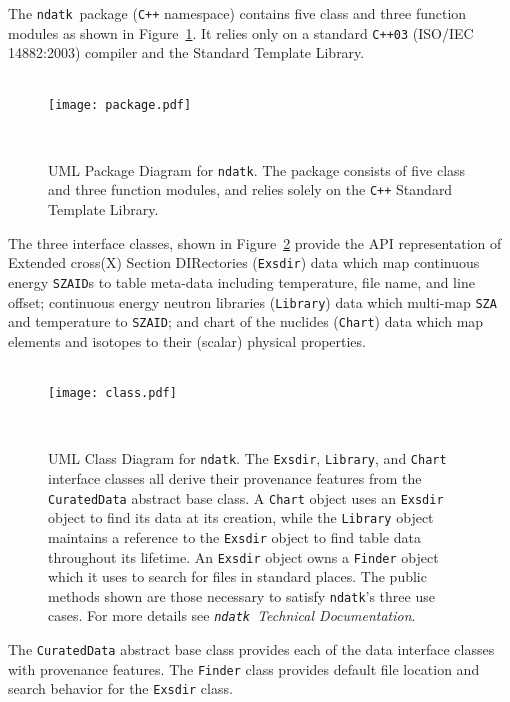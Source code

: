 \documentclass[12pt]{lamemo}
\newcommand{\ndatk}{\texttt{ndatk}}
\newcommand{\zaid}{\texttt{SZAID}}
\begin{document}
The \ndatk\ package (\texttt{C++} namespace)
contains five class and three function modules as shown in
Figure~\ref{fig:package}.  It relies only on a standard
\texttt{C++03} (ISO/IEC 14882:2003) compiler and the Standard Template
Library.
\begin{figure}[h!]\centering
\hrulefill\\
\texttt{[image: package.pdf]}
\caption{UML Package Diagram for \ndatk. The package consists of five
  class and three function modules, and relies solely on
  the \texttt{C++} Standard Template Library.} \label{fig:package}
\hrulefill\\
\end{figure}

The three interface classes, shown in Figure~\ref{fig:class} provide
the API representation of Extended cross(X) Section DIRectories
(\texttt{Exsdir}) data which map continuous energy \zaid s to table
meta-data including temperature, file name, and line offset;
continuous energy neutron libraries (\texttt{Library}) data
which multi-map \texttt{SZA} and temperature to \zaid; and chart of
the nuclides (\texttt{Chart}) data which map elements and isotopes to their
(scalar) physical properties.
\begin{figure}\centering
\hrulefill\\
\texttt{[image: class.pdf]}
\caption{UML Class Diagram for \ndatk.  The \texttt{Exsdir},
  \texttt{Library}, and \texttt{Chart} interface classes all derive
  their provenance features from the \texttt{CuratedData} abstract
  base class.  A \texttt{Chart} object uses an \texttt{Exsdir} object
  to find its data at its creation, while the \texttt{Library} object
  maintains a reference to the \texttt{Exsdir} object to find table
  data throughout its lifetime.  An \texttt{Exsdir} object owns a
  \texttt{Finder} object which it uses to search for files in standard
  places.  The public methods shown are those necessary to satisfy
  \ndatk's three use cases.  For more details see
  \emph{\ndatk\ Technical Documentation}.} \label{fig:class}
\hrulefill\\
\end{figure}
The \texttt{CuratedData} abstract base class provides each of the data
interface classes with provenance features.  The \texttt{Finder} class
provides default file location and search behavior for the
\texttt{Exsdir} class.
\end{document}
